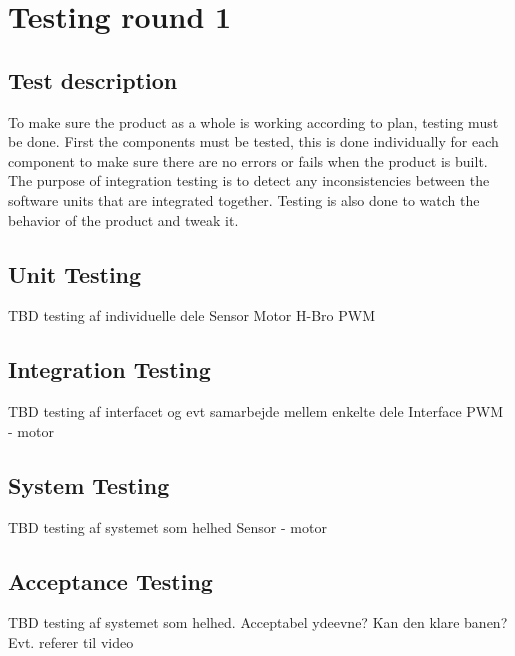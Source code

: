 \section{Testing round 1}

\subsection{Test description}
To make sure the product as a whole is working according to plan, testing must be done. First the components must be tested, this is done individually for each component to make sure there are no errors or fails when the product is built. The purpose of integration testing is to detect any inconsistencies between the software units that are integrated together. Testing is also done to watch the behavior of the product and tweak it.

\subsection{Unit Testing}
TBD testing af individuelle dele
Sensor
Motor
H-Bro
PWM

\subsection{Integration Testing}
TBD testing af interfacet og evt samarbejde mellem enkelte dele
Interface
PWM - motor

\subsection{System Testing}
TBD testing af systemet som helhed
Sensor - motor

\subsection{Acceptance Testing}
TBD testing af systemet som helhed. Acceptabel ydeevne?
Kan den klare banen? 
Evt. referer til video





